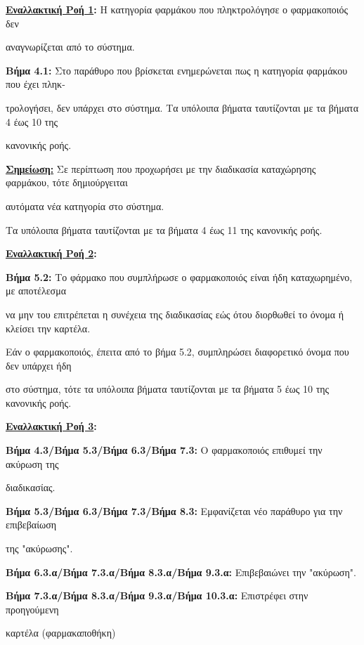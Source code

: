 \documentclass{article}
\begin{document}
 \textbf{\underline{Εναλλακτική Ροή 1}:}  
Η κατηγορία φαρμάκου που πληκτρολόγησε ο φαρμακοποιός δεν \par αναγνωρίζεται από το σύστημα. \vspace{0.1cm}
\par \textbf{Βήμα 4.1:} Στο παράθυρο που βρίσκεται ενημερώνεται πως η κατηγορία φαρμάκου που έχει πληκ- \par τρολογήσει, δεν υπάρχει στο σύστημα.
Τα υπόλοιπα βήματα ταυτίζονται με τα βήματα 4 έως 10 της \par κανονικής ροής. \vspace{0.1cm}
\par \textbf{\underline{Σημείωση:}} Σε περίπτωση που προχωρήσει με την διαδικασία καταχώρησης φαρμάκου, τότε δημιούργειται \par αυτόματα νέα κατηγορία στο σύστημα. \vspace{0.1cm}

\par Τα υπόλοιπα βήματα ταυτίζονται με τα βήματα 4 έως 11 της κανονικής ροής.\vspace{0.1cm}

\vspace{0.2cm}
 
\textbf{\underline{Εναλλακτική Ροή 2}:} \vspace{0.2cm} 
\par \textbf{Βήμα 5.2:} Το φάρμακο που συμπλήρωσε ο φαρμακοποιός είναι ήδη καταχωρημένο, με αποτέλεσμα \par να μην του επιτρέπεται η συνέχεια της διαδικασίας εώς ότου διορθωθεί το όνομα ή κλείσει την καρτέλα.\vspace{0.1cm}

\par Εάν ο φαρμακοποιός, έπειτα από το βήμα 5.2, συμπληρώσει διαφορετικό όνομα που δεν υπάρχει ήδη \par στο σύστημα, τότε τα υπόλοιπα βήματα ταυτίζονται με τα βήματα 5 έως 10 της κανονικής ροής.

\vspace{0.2cm}

\textbf{\underline{Εναλλακτική Ροή 3}:} \newline
\par \textbf{Βήμα 4.3/Βήμα 5.3/Βήμα 6.3/Βήμα 7.3:} Ο φαρμακοποιός επιθυμεί την ακύρωση της \par διαδικασίας.

\vspace{0.2cm}

\par \textbf{Βήμα 5.3/Βήμα 6.3/Βήμα 7.3/Βήμα 8.3:} Εμφανίζεται νέο παράθυρο για την επιβεβαίωση \par της  "ακύρωσης". \vspace{0.1cm}
\par \textbf{Βήμα 6.3.α/Βήμα 7.3.α/Βήμα 8.3.α/Βήμα 9.3.α:} Επιβεβαιώνει την "ακύρωση". \vspace{0.1cm}
\par \textbf{Βήμα 7.3.α/Βήμα 8.3.α/Βήμα 9.3.α/Βήμα 10.3.α:} Επιστρέφει στην προηγούμενη \par καρτέλα (φαρμακαποθήκη) \vspace{0.2cm}
\end{document}
